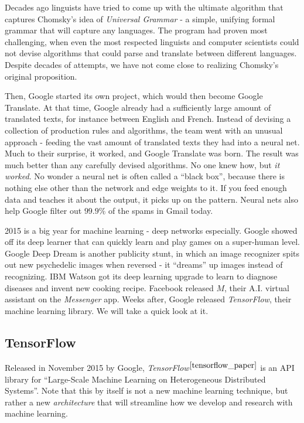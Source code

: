 \documentclass[12pt]{article}  %
\begin{document}
Decades ago linguists have tried to come up with the ultimate algorithm that captures Chomsky's idea of \emph{Universal Grammar} - a simple, unifying formal grammar that will capture any languages. The program had proven most challenging, when even the most respected linguists and computer scientists could not devise algorithms that could parse and translate between different languages. Despite decades of attempts, we have not come close to realizing Chomsky's original proposition.

Then, Google started its own project, which would then become Google Translate. At that time, Google already had a sufficiently large amount of translated texts, for instance between English and French. Instead of devising a collection of production rules and algorithms, the team went with an unusual approach - feeding the vast amount of translated texts they had into a neural net. Much to their surprise, it worked, and Google Translate was born. The result was much better than any carefully devised algorithms. No one knew how, but \emph{it worked}. No wonder a neural net is often called a ``black box'', because there is nothing else other than the network and edge weights to it. If you feed enough data and teaches it about the output, it picks up on the pattern. Neural nets also help Google filter out $99.9\%$ of the spams in Gmail today.


2015 is a big year for machine learning - deep networks especially. Google showed off its deep learner that can quickly learn and play games on a super-human level. Google Deep Dream is another publicity stunt, in which an image recognizer spits out new psychedelic images when reversed - it ``dreams'' up images instead of recognizing. IBM Watson got its deep learning upgrade to learn to diagnose diseases and invent new cooking recipe. Facebook released $M$, their A.I. virtual assistant on the \emph{Messenger} app. Weeks after, Google released \emph{TensorFlow}, their machine learning library. We will take a quick look at it.


\subsection{TensorFlow}

Released in November 2015 by Google, \emph{TensorFlow}$^{\ref{tensorflow_paper}}$ is an API library for ``Large-Scale Machine Learning on Heterogeneous Distributed Systems''. Note that this by itself is not a new machine learning technique, but rather a new \emph{architecture} that will streamline how we develop and research with machine learning.
\end{document}
